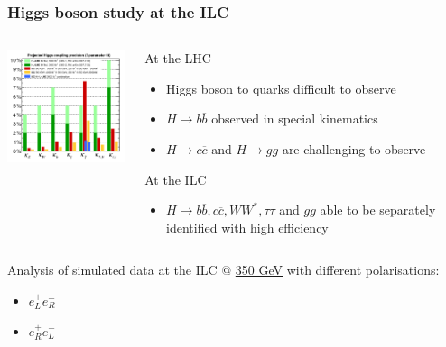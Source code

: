 \documentclass{beamer}
\begin{document}
    \begin{frame}
    \frametitle{Higgs boson study at the ILC}

    \vspace{-0.3cm}
    \begin{columns}[c]
      \begin{column}{5cm}
        \begin{center}
          \includegraphics[width = 5cm]{Pictures/Figures_HiggsCoupling500LHC.png}
        \end{center}
      \end{column}
      \begin{column}{5cm}
        \begin{block}{At the LHC}
          \footnotesize
          \begin{itemize}
            \item Higgs boson to quarks difficult to observe
            \item $H \rightarrow b\overline{b}$ observed in special kinematics
            \item $H \rightarrow c\overline{c}$ and $H \rightarrow gg$ are challenging to observe
          \end{itemize}
        \end{block}
        \vspace{-0.3cm}
        \begin{block}{At the ILC}
          \footnotesize
          \begin{itemize}
            \item $H \rightarrow b\overline{b}, c\overline{c}, WW^{*}, \tau\tau$ and $gg$ able to be separately identified with high efficiency 
          \end{itemize}
        \end{block}

      \end{column}
    \end{columns}

    \vspace{-0.1cm}
    \begin{center}
      Analysis of simulated data at the ILC @ \hyperlink{Xsec}{350 GeV} with different polarisations:
        \vspace{-0.2cm}
        \begin{itemize}
          \item $e^+_L e^-_R$
          \item $e^+_R e^-_L$
        \end{itemize}
    \end{center}

\end{frame}
\end{document}
